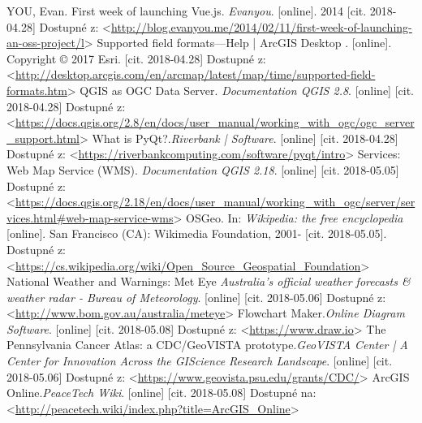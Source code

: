\documentclass[12pt,a4paper]{article}
\begin{document}
\begin{thebibliography}{99}
YOU, Evan. First week of launching Vue.js. \textit{Evanyou}. [online]. 2014
[cit. 2018-04.28]
Dostupné z: \textless\url{http://blog.evanyou.me/2014/02/11/first-week-of-launching-an-oss-project/l}\textgreater
{}
Supported field formats—Help | ArcGIS Desktop \textit{}. [online]. Copyright © 2017 Esri.
[cit. 2018-04.28]
Dostupné z: \textless\url{http://desktop.arcgis.com/en/arcmap/latest/map/time/supported-field-formats.htm}\textgreater
{}
QGIS as OGC Data Server. \textit{Documentation QGIS 2.8}. [online]
[cit. 2018-04.28]
Dostupné z: \textless\url{https://docs.qgis.org/2.8/en/docs/user_manual/working_with_ogc/ogc_server_support.html}\textgreater
{}
What is PyQt?.\textit{Riverbank | Software}. [online]
[cit. 2018-04.28]
Dostupné z:
\textless\url{https://riverbankcomputing.com/software/pyqt/intro}\textgreater
{}
Services: Web Map Service (WMS). \textit{Documentation QGIS 2.18}. [online]
[cit. 2018-05.05]
Dostupné z: \textless\url{https://docs.qgis.org/2.18/en/docs/user_manual/working_with_ogc/server/services.html#web-map-service-wms}\textgreater
{}
OSGeo. In: \textit{Wikipedia: the free encyclopedia} [online]. San Francisco (CA): Wikimedia Foundation, 2001- 
[cit. 2018-05.05]. Dostupné z: \textless\url{https://cs.wikipedia.org/wiki/Open_Source_Geospatial_Foundation}\textgreater
{}
National Weather and Warnings: Met Eye \textit{Australia's official weather forecasts \& weather radar - Bureau of Meteorology}. [online]
[cit. 2018-05.06] Dostupné z: \textless\url{http://www.bom.gov.au/australia/meteye}\textgreater
{}
Flowchart Maker.\textit{Online Diagram Software}. [online] [cit. 2018-05.08]
Dostupné z: \textless\url{https://www.draw.io}\textgreater
\newpage
{}
The Pennsylvania Cancer Atlas: a CDC/GeoVISTA prototype.\textit{GeoVISTA Center | A Center for Innovation Across the GIScience Research Landscape}. [online] [cit. 2018-05.06]
Dostupné z: \textless\url{https://www.geovista.psu.edu/grants/CDC/}\textgreater
{}
ArcGIS Online.\textit{PeaceTech Wiki}. [online] [cit. 2018-05.08]
Dostupné na: \textless\url{http://peacetech.wiki/index.php?title=ArcGIS_Online}\textgreater
\end{thebibliography}


\end{document}
